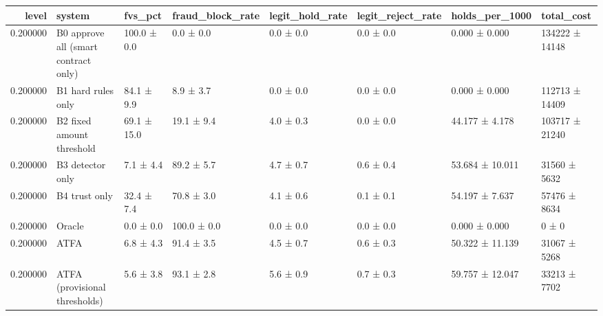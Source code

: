 \begin{tabular}{rlllllll}
\toprule
level & system & fvs\_pct & fraud\_block\_rate & legit\_hold\_rate & legit\_reject\_rate & holds\_per\_1000 & total\_cost \\
\midrule
0.200000 & B0 approve all (smart contract only) & 100.0 ± 0.0 & 0.0 ± 0.0 & 0.0 ± 0.0 & 0.0 ± 0.0 & 0.000 ± 0.000 & 134222 ± 14148 \\
0.200000 & B1 hard rules only & 84.1 ± 9.9 & 8.9 ± 3.7 & 0.0 ± 0.0 & 0.0 ± 0.0 & 0.000 ± 0.000 & 112713 ± 14409 \\
0.200000 & B2 fixed amount threshold & 69.1 ± 15.0 & 19.1 ± 9.4 & 4.0 ± 0.3 & 0.0 ± 0.0 & 44.177 ± 4.178 & 103717 ± 21240 \\
0.200000 & B3 detector only & 7.1 ± 4.4 & 89.2 ± 5.7 & 4.7 ± 0.7 & 0.6 ± 0.4 & 53.684 ± 10.011 & 31560 ± 5632 \\
0.200000 & B4 trust only & 32.4 ± 7.4 & 70.8 ± 3.0 & 4.1 ± 0.6 & 0.1 ± 0.1 & 54.197 ± 7.637 & 57476 ± 8634 \\
0.200000 & Oracle & 0.0 ± 0.0 & 100.0 ± 0.0 & 0.0 ± 0.0 & 0.0 ± 0.0 & 0.000 ± 0.000 & 0 ± 0 \\
0.200000 & ATFA & 6.8 ± 4.3 & 91.4 ± 3.5 & 4.5 ± 0.7 & 0.6 ± 0.3 & 50.322 ± 11.139 & 31067 ± 5268 \\
0.200000 & ATFA (provisional thresholds) & 5.6 ± 3.8 & 93.1 ± 2.8 & 5.6 ± 0.9 & 0.7 ± 0.3 & 59.757 ± 12.047 & 33213 ± 7702 \\
\bottomrule
\end{tabular}
